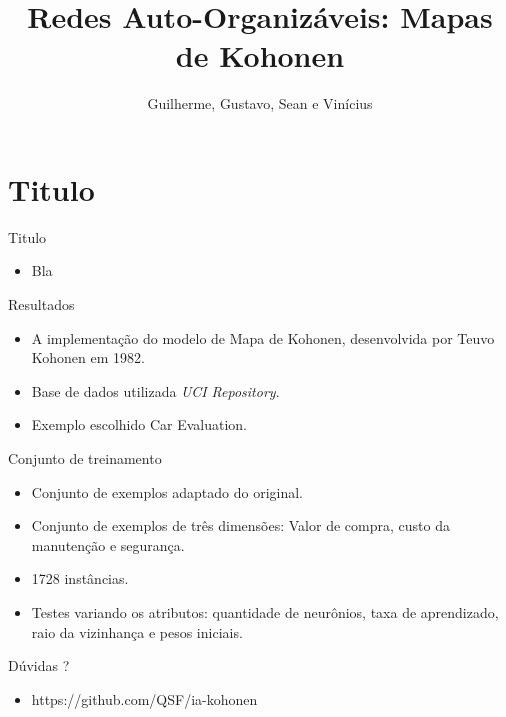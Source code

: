 \documentclass{beamer}
\title{Redes Auto-Organizáveis: Mapas de Kohonen}
\author{Guilherme, Gustavo, Sean e Vinícius}
\institute{Universidade Estadual de Londrina}
\begin{document}
\frame{\titlepage}



\section{Titulo}

\begin{frame}{Titulo}
	\begin{itemize}
	  \item Bla
	\end{itemize}
\end{frame}

\begin{frame}{Resultados}
	\begin{itemize}
	  \item A implementação do modelo de Mapa de Kohonen, desenvolvida por Teuvo Kohonen em 1982.
	  \item Base de dados utilizada \textit{UCI Repository}.
	  \item Exemplo escolhido Car Evaluation.
	\end{itemize}
\end{frame}

\begin{frame}{Conjunto de treinamento}
	\begin{itemize}
	  \item Conjunto de exemplos adaptado do original. 
	  \item Conjunto de exemplos de três dimensões: Valor de compra, custo da manutenção e segurança.
	  \item 1728 instâncias.
	  \item Testes variando os atributos: quantidade de neurônios, taxa de aprendizado, raio da vizinhança e pesos iniciais.
	\end{itemize}
\end{frame}

\begin{frame}{Dúvidas ?}
	\begin{itemize}
	  \item https://github.com/QSF/ia-kohonen
	\end{itemize}
\end{frame}
\end{document}
